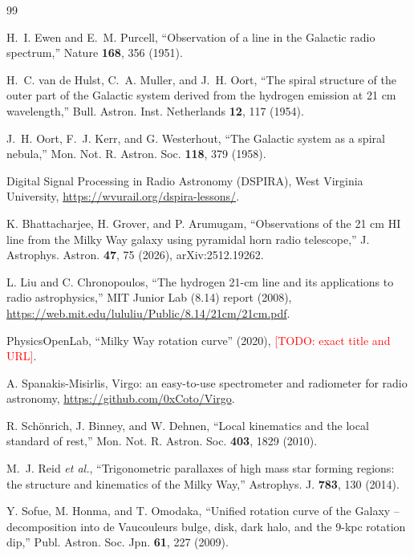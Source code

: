 \documentclass[aip,apl,reprint,amsmath,amssymb]{revtex4-2}
\newcommand{\todo}[1]{\textcolor{red}{[TODO: #1]}}
\begin{document}
\begin{thebibliography}{99}

H.~I. Ewen and E.~M. Purcell, ``Observation of a line in the Galactic radio spectrum,'' Nature \textbf{168}, 356 (1951).

H.~C. van de Hulst, C.~A. Muller, and J.~H. Oort, ``The spiral structure of the outer part of the Galactic system derived from the hydrogen emission at 21 cm wavelength,'' Bull. Astron. Inst. Netherlands \textbf{12}, 117 (1954).

J.~H. Oort, F.~J. Kerr, and G. Westerhout, ``The Galactic system as a spiral nebula,'' Mon. Not. R. Astron. Soc. \textbf{118}, 379 (1958).

Digital Signal Processing in Radio Astronomy (DSPIRA), West Virginia University, \url{https://wvurail.org/dspira-lessons/}.

K. Bhattacharjee, H. Grover, and P. Arumugam, ``Observations of the 21 cm HI line from the Milky Way galaxy using pyramidal horn radio telescope,'' J. Astrophys. Astron. \textbf{47}, 75 (2026), arXiv:2512.19262.

L. Liu and C. Chronopoulos, ``The hydrogen 21-cm line and its applications to radio astrophysics,'' MIT Junior Lab (8.14) report (2008), \url{https://web.mit.edu/lululiu/Public/8.14/21cm/21cm.pdf}.

PhysicsOpenLab, ``Milky Way rotation curve'' (2020), \todo{exact title and URL}.

A. Spanakis-Misirlis, Virgo: an easy-to-use spectrometer and radiometer for radio astronomy, \url{https://github.com/0xCoto/Virgo}.

R. Sch\"onrich, J. Binney, and W. Dehnen, ``Local kinematics and the local standard of rest,'' Mon. Not. R. Astron. Soc. \textbf{403}, 1829 (2010).

M.~J. Reid \textit{et al.}, ``Trigonometric parallaxes of high mass star forming regions: the structure and kinematics of the Milky Way,'' Astrophys. J. \textbf{783}, 130 (2014).

Y. Sofue, M. Honma, and T. Omodaka, ``Unified rotation curve of the Galaxy -- decomposition into de Vaucouleurs bulge, disk, dark halo, and the 9-kpc rotation dip,'' Publ. Astron. Soc. Jpn. \textbf{61}, 227 (2009).

\end{thebibliography}
\end{document}
